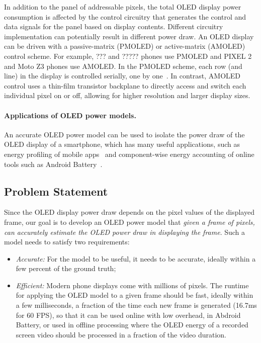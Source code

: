 In addition to the panel of addressable pixels, the total OLED display
power consumption is affected by the control circuitry
that generates the control and data signals for the panel based on
display contents. Different circuitry implementation can potentially
result in different power draw.
{An OLED display can be driven with a passive-matrix (PMOLED) or
active-matrix (AMOLED) control scheme.  For example, ??? and ?????
phones use PMOLED and PIXEL 2 and Moto Z3 phones use AMOLED. In the PMOLED
scheme, each row (and line) in the display is controlled serially, one
by one~\cite{pmoled:amoled}. In contrast, AMOLED control uses a
thin-film transistor backplane to directly access and switch each
individual pixel on or off, allowing for higher resolution and larger
display sizes.
}
\fi

\paragraph{Applications of OLED power models.}
An accurate OLED power model can be used to isolate the power draw of
the OLED display of a smartphone, which has many useful applications,
such as energy profiling of mobile
apps~\cite{appscope,zhang2010accurate,shye2009into,pathak:eurosys12,mittal:mobicom12}
and component-wise energy accounting of online tools such as Android
Battery~\cite{???}.
\fi

\subsection{Problem Statement}
\label{subsec:problem}

Since the OLED display power draw depends on the pixel values of the
displayed frame, our goal is to develop an OLED power model that {\em
  given a frame of pixels, can accurately estimate the OLED power draw
  in displaying the frame}.  Such a model needs to satisfy two
requirements:
  \begin{itemize}[leftmargin=*]
\item {\em Accurate:} For the model to be useful, it needs to be accurate, ideally within a few percent
of the ground truth;
\item {\em Efficient:} Modern phone displays come with millions of pixels.
The runtime for applying the OLED model to a given
frame should be fast, ideally within a few milliseconds, \ie a fraction of
the time each new frame is generated (16.7ms for 60 FPS),
so that it can be used online with low overhead, \eg in Abdroid Battery,
or used in offline processing where the OLED energy of a recorded screen video
should be processed in a fraction of the video duration.
\end{itemize}
  \fi
  

